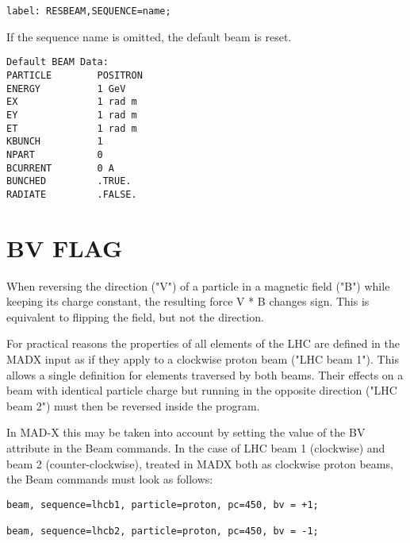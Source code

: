 \begin{verbatim}
label: RESBEAM,SEQUENCE=name;
\end{verbatim} 

If the sequence name is omitted, the default beam is reset. 
\begin{verbatim}
Default BEAM Data:
PARTICLE        POSITRON
ENERGY          1 GeV
EX              1 rad m
EY              1 rad m
ET              1 rad m
KBUNCH          1
NPART           0
BCURRENT        0 A
BUNCHED         .TRUE.
RADIATE         .FALSE.
\end{verbatim}



%
\section{BV FLAG}
When reversing the direction ("V") of a particle in a magnetic field
("B") while keeping its charge constant, the resulting force V * B
changes sign. This is equivalent to flipping the field, but not the
direction.  

For practical reasons the properties of all elements of the LHC are
defined in the MADX input as if they apply to a clockwise proton beam
("LHC beam 1"). This allows a single definition for elements traversed
by both beams. Their effects on a beam with identical particle charge
but running in the opposite direction ("LHC beam 2") must then be
reversed inside the program.  

In MAD-X this may be taken into account by setting the value of the BV
attribute in the Beam commands. In the case of LHC beam 1 (clockwise)
and beam 2 (counter-clockwise), treated in MADX both as clockwise proton
beams, the Beam commands must look as follows: 

\begin{verbatim}
beam, sequence=lhcb1, particle=proton, pc=450, bv = +1;

beam, sequence=lhcb2, particle=proton, pc=450, bv = -1;
\end{verbatim}






